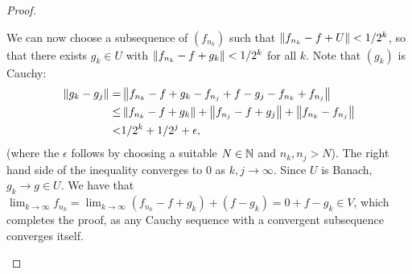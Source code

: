 \begin{proof}
\begin{enumerate}
    We can now choose a subsequence of $(f_{n_k})$ such that $\left\lVert f_{n_k} - f + U\right\rVert < 1/2^k$, so that there exists $g_k \in U$ with $\left\lVert f_{n_k} - f + g_k\right\rVert < 1/2^k$ for all $k$.
    Note that $(g_k)$ is Cauchy:
    \begin{align*}
        \left\lVert g_k - g_j\right\rVert
        =& \left\lVert f_{n_k} - f + g_k - f_{n_j} + f - g_j - f_{n_k} + f_{n_j}\right\rVert\\
        \leq& \left\lVert f_{n_k} - f + g_k\right\rVert + \left\lVert f_{n_j} - f + g_j\right\rVert + \left\lVert f_{n_k} - f_{n_j}\right\rVert\\
        <& 1/2^k + 1/2^j + \epsilon,
    \end{align*}
    (where the $\epsilon$ follows by choosing a suitable $N \in \mathbb{N}$ and $n_k, n_j > N$).
    The right hand side of the inequality converges to 0 as $k, j \to \infty$.
    Since $U$ is Banach, $g_k \to g \in U$.
    We have that $\lim_{k \to \infty} f_{n_k} = \lim_{k \to \infty} (f_{n_k} - f + g_k) + (f - g_k) = 0 + f - g_k \in V$, which completes the proof, as any Cauchy sequence with a convergent subsequence converges itself.
\end{enumerate}
\end{proof} 

